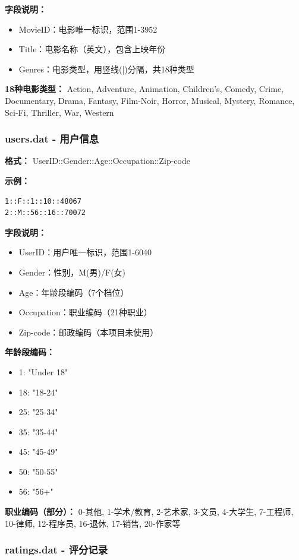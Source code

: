 \documentclass[12pt,a4paper]{article}
\begin{document}
\textbf{字段说明：}
\begin{itemize}
    \item MovieID：电影唯一标识，范围1-3952
    \item Title：电影名称（英文），包含上映年份
    \item Genres：电影类型，用竖线(|)分隔，共18种类型
\end{itemize}

\textbf{18种电影类型：}
Action, Adventure, Animation, Children's, Comedy, Crime, Documentary, Drama, Fantasy, Film-Noir, Horror, Musical, Mystery, Romance, Sci-Fi, Thriller, War, Western

\subsubsection{users.dat - 用户信息}

\textbf{格式：} UserID::Gender::Age::Occupation::Zip-code

\textbf{示例：}
\begin{lstlisting}
1::F::1::10::48067
2::M::56::16::70072
\end{lstlisting}

\textbf{字段说明：}
\begin{itemize}
    \item UserID：用户唯一标识，范围1-6040
    \item Gender：性别，M(男)/F(女)
    \item Age：年龄段编码（7个档位）
    \item Occupation：职业编码（21种职业）
    \item Zip-code：邮政编码（本项目未使用）
\end{itemize}

\textbf{年龄段编码：}
\begin{itemize}
    \item 1: "Under 18"
    \item 18: "18-24"
    \item 25: "25-34"
    \item 35: "35-44"
    \item 45: "45-49"
    \item 50: "50-55"
    \item 56: "56+"
\end{itemize}

\textbf{职业编码（部分）：}
0-其他, 1-学术/教育, 2-艺术家, 3-文员, 4-大学生, 7-工程师, 10-律师, 12-程序员, 16-退休, 17-销售, 20-作家等

\subsubsection{ratings.dat - 评分记录}
\end{document}
